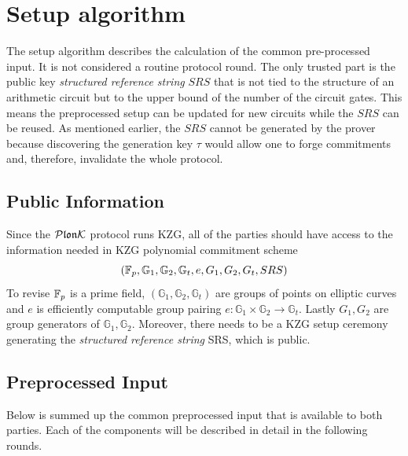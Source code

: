 \section{Setup algorithm}
\label{chap:round0}
The setup algorithm describes the calculation of the common pre-processed input. It is not considered a routine protocol round. The only trusted part is the public key \textit{structured reference string} $SRS$ that is not tied to the structure of an arithmetic circuit but to the upper bound of the number of the circuit gates. This means the preprocessed setup can be updated for new circuits while the $SRS$ can be reused. As mentioned earlier, the $SRS$ cannot be generated by the prover because discovering the generation key $\tau$ would allow one to forge commitments and, therefore, invalidate the whole protocol.

\subsection{Public Information }
Since the $\mathcal{P}\mathfrak{lon}\mathcal{K}$ protocol runs KZG, all of the parties should have access to the information needed in KZG polynomial commitment scheme $$(\mathbb{F}_p, \mathbb{G}_1, \mathbb{G}_2, \mathbb{G}_t, e, G_1, G_2, G_t, SRS)$$ To revise $\mathbb{F}_p$ is a prime field, $(\mathbb{G}_1, \mathbb{G}_2, \mathbb{G}_t)$ are groups of points on elliptic curves and $e$ is efficiently computable group pairing $e: \mathbb{G}_1 \times \mathbb{G}_2 \rightarrow \mathbb{G}_t$. Lastly $G_1, G_2$ are group generators of $\mathbb{G}_1, \mathbb{G}_2$. Moreover, there needs to be a KZG setup ceremony generating the \textit{structured reference string} SRS, which is public. 

\subsection{Preprocessed Input}
Below is summed up the common preprocessed input that is available to both parties. Each of the components will be described in detail in the following rounds.

